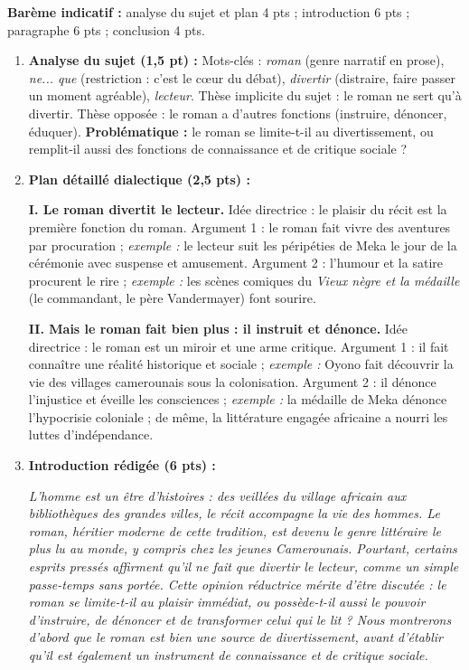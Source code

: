 \documentclass[11pt]{article}
\begin{document}
\begin{corrige}
\textbf{Barème indicatif :} analyse du sujet et plan 4 pts ; introduction 6 pts ; paragraphe 6 pts ; conclusion 4 pts.

\begin{enumerate}
\item \textbf{Analyse du sujet (1,5 pt) :} Mots-clés : \emph{roman} (genre narratif en prose), \emph{ne... que} (restriction : c'est le cœur du débat), \emph{divertir} (distraire, faire passer un moment agréable), \emph{lecteur}. Thèse implicite du sujet : le roman ne sert qu'à divertir. Thèse opposée : le roman a d'autres fonctions (instruire, dénoncer, éduquer). \textbf{Problématique :} le roman se limite-t-il au divertissement, ou remplit-il aussi des fonctions de connaissance et de critique sociale ?

\item \textbf{Plan détaillé dialectique (2,5 pts) :}

\textbf{I. Le roman divertit le lecteur.}
Idée directrice : le plaisir du récit est la première fonction du roman.
Argument 1 : le roman fait vivre des aventures par procuration ; \emph{exemple :} le lecteur suit les péripéties de Meka le jour de la cérémonie avec suspense et amusement.
Argument 2 : l'humour et la satire procurent le rire ; \emph{exemple :} les scènes comiques du \emph{Vieux nègre et la médaille} (le commandant, le père Vandermayer) font sourire.

\textbf{II. Mais le roman fait bien plus : il instruit et dénonce.}
Idée directrice : le roman est un miroir et une arme critique.
Argument 1 : il fait connaître une réalité historique et sociale ; \emph{exemple :} Oyono fait découvrir la vie des villages camerounais sous la colonisation.
Argument 2 : il dénonce l'injustice et éveille les consciences ; \emph{exemple :} la médaille de Meka dénonce l'hypocrisie coloniale ; de même, la littérature engagée africaine a nourri les luttes d'indépendance.

\item \textbf{Introduction rédigée (6 pts) :}

\emph{L'homme est un être d'histoires : des veillées du village africain aux bibliothèques des grandes villes, le récit accompagne la vie des hommes. Le roman, héritier moderne de cette tradition, est devenu le genre littéraire le plus lu au monde, y compris chez les jeunes Camerounais. Pourtant, certains esprits pressés affirment qu'il ne fait que divertir le lecteur, comme un simple passe-temps sans portée. Cette opinion réductrice mérite d'être discutée : le roman se limite-t-il au plaisir immédiat, ou possède-t-il aussi le pouvoir d'instruire, de dénoncer et de transformer celui qui le lit ? Nous montrerons d'abord que le roman est bien une source de divertissement, avant d'établir qu'il est également un instrument de connaissance et de critique sociale.}


\end{enumerate}
\end{corrige}
\end{document}
